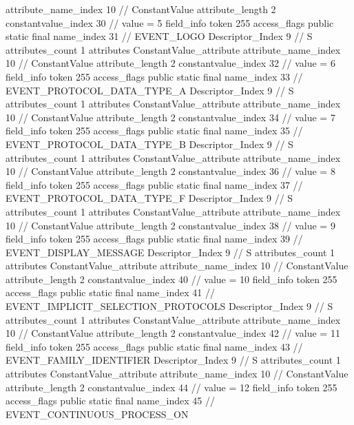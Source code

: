 {{{{{{{					attribute_name_index	10		// ConstantValue
					attribute_length	2
					constantvalue_index	30		// value = 5
				}
				}
			}
			field_info {
				token	255
				access_flags	public static final
				name_index	31		// EVENT_LOGO
				Descriptor_Index	9		// S
				attributes_count	1
				attributes {
				ConstantValue_attribute {
					attribute_name_index	10		// ConstantValue
					attribute_length	2
					constantvalue_index	32		// value = 6
				}
				}
			}
			field_info {
				token	255
				access_flags	public static final
				name_index	33		// EVENT_PROTOCOL_DATA_TYPE_A
				Descriptor_Index	9		// S
				attributes_count	1
				attributes {
				ConstantValue_attribute {
					attribute_name_index	10		// ConstantValue
					attribute_length	2
					constantvalue_index	34		// value = 7
				}
				}
			}
			field_info {
				token	255
				access_flags	public static final
				name_index	35		// EVENT_PROTOCOL_DATA_TYPE_B
				Descriptor_Index	9		// S
				attributes_count	1
				attributes {
				ConstantValue_attribute {
					attribute_name_index	10		// ConstantValue
					attribute_length	2
					constantvalue_index	36		// value = 8
				}
				}
			}
			field_info {
				token	255
				access_flags	public static final
				name_index	37		// EVENT_PROTOCOL_DATA_TYPE_F
				Descriptor_Index	9		// S
				attributes_count	1
				attributes {
				ConstantValue_attribute {
					attribute_name_index	10		// ConstantValue
					attribute_length	2
					constantvalue_index	38		// value = 9
				}
				}
			}
			field_info {
				token	255
				access_flags	public static final
				name_index	39		// EVENT_DISPLAY_MESSAGE
				Descriptor_Index	9		// S
				attributes_count	1
				attributes {
				ConstantValue_attribute {
					attribute_name_index	10		// ConstantValue
					attribute_length	2
					constantvalue_index	40		// value = 10
				}
				}
			}
			field_info {
				token	255
				access_flags	public static final
				name_index	41		// EVENT_IMPLICIT_SELECTION_PROTOCOLS
				Descriptor_Index	9		// S
				attributes_count	1
				attributes {
				ConstantValue_attribute {
					attribute_name_index	10		// ConstantValue
					attribute_length	2
					constantvalue_index	42		// value = 11
				}
				}
			}
			field_info {
				token	255
				access_flags	public static final
				name_index	43		// EVENT_FAMILY_IDENTIFIER
				Descriptor_Index	9		// S
				attributes_count	1
				attributes {
				ConstantValue_attribute {
					attribute_name_index	10		// ConstantValue
					attribute_length	2
					constantvalue_index	44		// value = 12
				}
				}
			}
			field_info {
				token	255
				access_flags	public static final
				name_index	45		// EVENT_CONTINUOUS_PROCESS_ON
}}}}}
